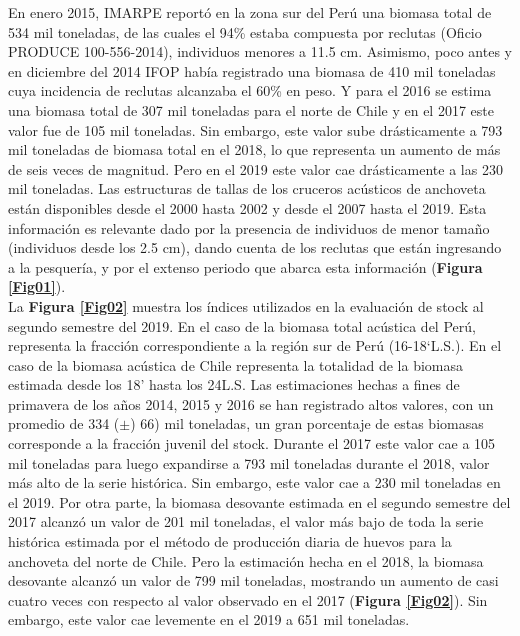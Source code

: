 \documentclass[letter,11pt]{article}
\begin{document}
En enero 2015, IMARPE report\'o en la zona sur del Per\'u una biomasa
total de 534 mil toneladas, de las cuales el 94\% estaba compuesta por reclutas
(Oficio PRODUCE 100-556-2014), individuos menores a
11.5 cm. Asimismo, poco antes y en diciembre del 2014 IFOP hab\'ia
registrado una biomasa de 410 mil toneladas cuya incidencia de reclutas
alcanzaba el 60\% en peso. Y para el 2016 se estima una biomasa total de
307 mil toneladas para el norte de Chile y en el 2017 este valor fue de
105 mil toneladas. Sin embargo, este valor sube dr\'asticamente a 793 mil
toneladas de biomasa total en el 2018, lo que representa un aumento de
m\'as de seis veces de magnitud. Pero en el 2019 este valor cae
dr\'asticamente a las 230 mil toneladas. Las estructuras de tallas de los
cruceros ac\'usticos de anchoveta est\'an disponibles desde el 2000 hasta
2002 y desde el 2007 hasta el 2019. Esta informaci\'on es relevante dado
por la presencia de individuos de menor tama\~{n}o (individuos desde los 2.5 cm),
dando cuenta de los reclutas que est\'an ingresando a la pesquer\'ia, y por el
extenso periodo que abarca esta informaci\'on (\textbf{Figura \ref{Fig01}}).\\


La \textbf{Figura \ref{Fig02}} muestra los \'indices utilizados en la 
evaluaci\'on de stock al segundo semestre del 2019. En el caso de
la biomasa total ac\'ustica del Per\'u, representa la fracci\'on
correspondiente a la regi\'on sur de Per\'u (16-18`L.S.). En el
caso de la biomasa ac\'ustica de Chile representa la totalidad de la
biomasa estimada desde los 18' hasta los 24\degree L.S. Las
estimaciones hechas a fines de primavera de los a\~{n}os 2014, 2015 y 2016
se han registrado altos valores, con un promedio de 334 ($\pm$) 66) mil
toneladas, un gran porcentaje de estas biomasas corresponde a la
fracci\'on juvenil del stock. Durante el 2017 este valor cae a 105 mil
toneladas para luego expandirse a 793 mil toneladas durante el 2018,
valor m\'as alto de la serie hist\'orica. Sin embargo, este valor cae a 230
mil toneladas en el 2019. Por otra parte, la biomasa desovante estimada
en el segundo semestre del 2017 alcanz\'o un valor de 201 mil toneladas, el
valor m\'as bajo de toda la serie hist\'orica estimada por el m\'etodo de
producci\'on diaria de huevos para la anchoveta del norte de Chile. Pero la
estimaci\'on hecha en el 2018, la biomasa desovante alcanz\'o un valor de
799 mil toneladas, mostrando un aumento de casi cuatro veces con respecto al valor
observado en el 2017 (\textbf{Figura \ref{Fig02}}). Sin embargo, este
valor cae levemente en el 2019 a 651 mil toneladas.\\
\end{document}
